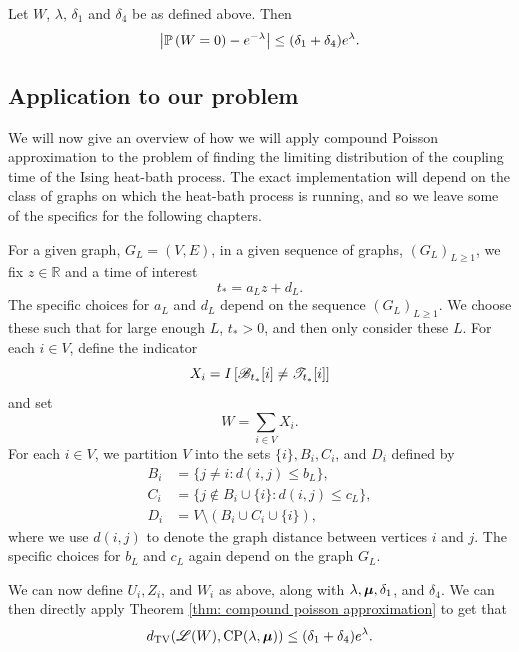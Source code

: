 	\begin{corollary}
	\label{cor: bound prob W = 0}
		Let $W$, $\lambda$, $\delta_1$ and $\delta_4$ be as defined above. Then
		\begin{equation}
			\left|\mathbb{P}\left(W = 0\right) - e^{-\lambda}\right| \leq (\delta_1 + \delta_4)e^\lambda.
		\end{equation}
	\end{corollary}

	\subsection{Application to our problem}
	\label{sec:application of compound poisson}
	We will now give an overview of how we will apply compound Poisson approximation to the problem of finding the limiting distribution of the coupling time of the Ising heat-bath process. The exact implementation will depend on the class of graphs on which the heat-bath process is running, and so we leave some of the specifics for the following chapters.

	For a given graph, $G_L = (V, E)$, in a given sequence of graphs, $(G_L)_{L \geq 1}$, we fix $z \in \mathbb{R}$ and a time of interest 
	\begin{equation}
		t_* = a_L z + d_L.
	\end{equation}
	The specific choices for $a_L$ and $d_L$ depend on the sequence $(G_L)_{L \geq 1}$. We choose these such that for large enough $L$, $t_* > 0$, and then only consider these $L$. For each $i \in V$, define the indicator
	\begin{equation}
		X_i = I\left[\mathscr{B}_{t_*}[i] \neq \mathscr{T}_{t_*}[i]\right]
	\end{equation}
	and set 
	\begin{equation}
		W = \sum_{i \in V} X_i.
	\end{equation}
	For each $i \in V$, we partition $V$ into the sets $\{i\}, B_i, C_i$, and $D_i$ defined by
	\begin{align}
		B_i &= \{j\neq i : d(i,j) \leq b_L \},\\
		C_i &= \{j\notin B_i\cup \{i\}: d(i,j) \leq c_L \},\\
		D_i &= V \setminus (B_i \cup C_i \cup \{i\}),
	\end{align}
	where we use $d(i, j)$ to denote the graph distance between vertices $i$ and $j$. The specific choices for $b_L$ and $c_L$ again depend on the graph $G_L$.

	We can now define $U_i, Z_i$, and $W_i$ as above, along with $\lambda, {\bm{{\mu}}}, \delta_1$, and $\delta_4$. We can then directly apply Theorem \ref{thm: compound poisson approximation} to get that
	\begin{equation}
		d_{\mathrm{TV}}(\mathscr{L}(W), \mathrm{CP}(\lambda, {\bm{{\mu}}})) \leq (\delta_1 + \delta_4)e^\lambda.
	\end{equation}


